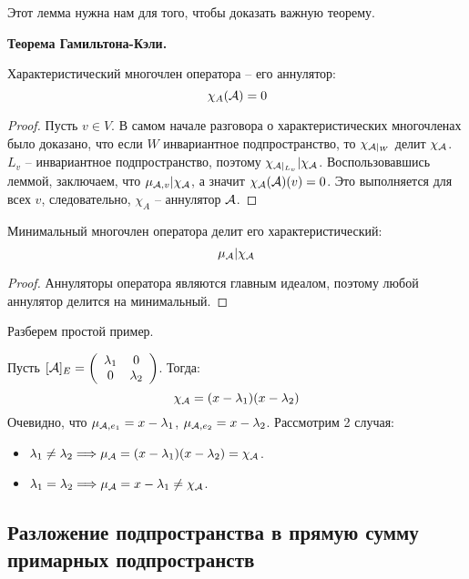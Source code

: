 Этот лемма нужна нам для того, чтобы доказать важную теорему.

\vspace*{3mm}

\textbf{Теорема Гамильтона-Кэли.} 

\quad\quad Характеристический многочлен оператора -- его аннулятор: \[ \chi_A(\mathcal{A}) = 0 \]

\begin{proof}
    Пусть $v \in V$.
    В самом начале разговора о характеристических многочленах было доказано, что если $W$ инвариантное подпространство, то $\chi_{\mathcal{A}|_W}$ делит $\chi_{\mathcal{A}}$.
    $L_v$ -- инвариантное подпространство, поэтому $\chi_{\mathcal{A}|_{L_v}} | \chi_{\mathcal{A}}$. 
    Воспользовавшись леммой, заключаем, что $\mu_{\mathcal{A}, v} | \chi_{\mathcal{A}}$, а значит $\chi_{\mathcal{A}}(\mathcal{A})(v) = 0$.
    Это выполняется для всех $v$, следовательно, $\chi_A$ -- аннулятор $\mathcal{A}$.
\end{proof}

\vspace*{3mm}

\follow Минимальный многочлен оператора делит его характеристический: \[ \mu_{\mathcal{A}} | \chi_{\mathcal{A}} \]
\begin{proof}
    Аннуляторы оператора являются главным идеалом, поэтому любой аннулятор делится на минимальный.
\end{proof}

\vspace*{3mm}

Разберем простой пример.

\begin{example}
    Пусть $[\mathcal{A}]_E = \left(\begin{array}{cc}
        \lambda_1 & 0 \\ 
        0 & \lambda_2
        \end{array}\right)$.
        Тогда: \[ \chi_{\mathcal{A}} = (x - \lambda_1)(x - \lambda_2) \]
        Очевидно, что $\mu_{\mathcal{A}, e_1} = x - \lambda_1$, $\mu_{\mathcal{A}, e_2} = x - \lambda_2$.
        Рассмотрим 2 случая:
        \begin{itemize}
            \item $ \lambda_1 \neq \lambda_2 \Longrightarrow \mu_{\mathcal{A}} = (x - \lambda_1) (x - \lambda_2) = \chi_{\mathcal{A}}$.
            \item $ \lambda_1 = \lambda_2 \Longrightarrow \mu_{\mathcal{A}} = x - \lambda_1 \neq \chi_{\mathcal{A}}$.
        \end{itemize} 
\end{example}


\subsection{Разложение подпространства в прямую сумму примарных подпространств}


